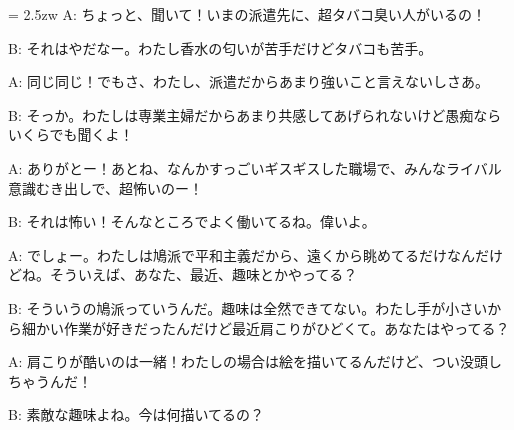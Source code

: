 \documentclass[11pt]{amsart}
\title{}
\author{}
\newenvironment{hangall}[1]{\hangindent = 2.5zw\everypar{\hangindent = 2.5zw}}{}
\begin{document}
\maketitle
\begin{hangall}{}%
A: ちょっと、聞いて！いまの派遣先に、超タバコ臭い人がいるの！

B: それはやだなー。わたし香水の匂いが苦手だけどタバコも苦手。

A: 同じ同じ！でもさ、わたし、派遣だからあまり強いこと言えないしさあ。

B: そっか。わたしは専業主婦だからあまり共感してあげられないけど愚痴ならいくらでも聞くよ！

A: ありがとー！あとね、なんかすっごいギスギスした職場で、みんなライバル意識むき出しで、超怖いのー！

B: それは怖い！そんなところでよく働いてるね。偉いよ。

A: でしょー。わたしは鳩派で平和主義だから、遠くから眺めてるだけなんだけどね。そういえば、あなた、最近、趣味とかやってる？

B: そういうの鳩派っていうんだ。趣味は全然できてない。わたし手が小さいから細かい作業が好きだったんだけど最近肩こりがひどくて。あなたはやってる？

A: 肩こりが酷いのは一緒！わたしの場合は絵を描いてるんだけど、つい没頭しちゃうんだ！

B: 素敵な趣味よね。今は何描いてるの？
\end{hangall}
\end{document}
